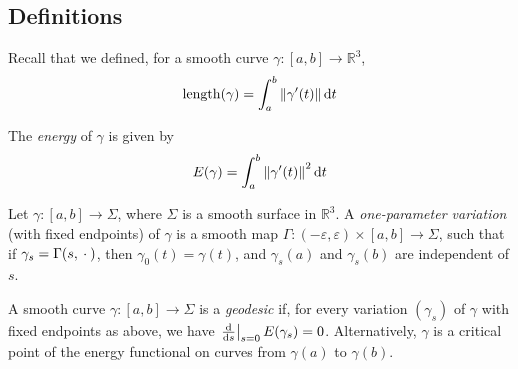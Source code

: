 \subsection{Definitions}
Recall that we defined, for a smooth curve \( \gamma \colon [a,b] \to \mathbb R^3 \),
\[ \mathrm{length}(\gamma) = \int_a^b \norm{\gamma'(t)} \dd{t} \]
\begin{definition}
	The \textit{energy} of \( \gamma \) is given by
	\[ E(\gamma) = \int_a^b \norm{\gamma'(t)}^2 \dd{t} \]
\end{definition}
\begin{definition}
	Let \( \gamma \colon [a,b] \to \Sigma \), where \( \Sigma \) is a smooth surface in \( \mathbb R^3 \).
	A \textit{one-parameter variation} (with fixed endpoints) of \( \gamma \) is a smooth map \( \Gamma \colon (-\varepsilon, \varepsilon) \times [a,b] \to \Sigma \), such that if \( \gamma_s = \Gamma(s,{}\cdot{}) \), then
	\( \gamma_0(t) = \gamma(t) \), and \( \gamma_s(a) \) and \( \gamma_s(b) \) are independent of \( s \).
\end{definition}
\begin{definition}
	A smooth curve \( \gamma \colon [a,b] \to \Sigma \) is a \textit{geodesic} if, for every variation \( (\gamma_s) \) of \( \gamma \) with fixed endpoints as above, we have \( \eval{\dv{s}}_{s=0} E(\gamma_s) = 0 \).
	Alternatively, \( \gamma \) is a critical point of the energy functional on curves from \( \gamma(a) \) to \( \gamma(b) \).
\end{definition}

